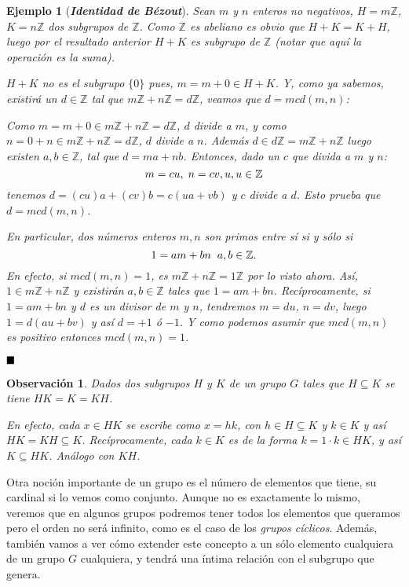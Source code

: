 \documentclass[12pt]{article}
\newtheorem{example}{Ejemplo}[theorem]
\newtheorem{observation}{Observación}[theorem]
\begin{document}
\begin{example}[\textbf{\textit{Identidad de Bézout}}]\label{ex:idBez} Sean $m$ y $n$ enteros no negativos, $H = m\mathbb{Z}$, $K = n\mathbb{Z}$ dos subgrupos de $\mathbb{Z}$. Como $\mathbb{Z}$ es abeliano es obvio que $H+K = K+H$, luego por el resultado anterior $H+K$ es subgrupo de $\mathbb{Z}$ (notar que aquí la operación es la suma).


$H+K$ no es el subgrupo $\lbrace 0 \rbrace$ pues, $m = m + 0 \in H + K$. Y, como ya sabemos, existirá un $d \in \mathbb{Z}$ tal que $m\mathbb{Z}+n\mathbb{Z} = d\mathbb{Z}$, veamos que $d = mcd(m,n)$:


Como $m = m + 0 \in m\mathbb{Z}+n\mathbb{Z} = d\mathbb{Z}$, $d$ divide a $m$, y como $n = 0 + n \in m\mathbb{Z}+n\mathbb{Z} = d\mathbb{Z}$, $d$ divide a $n$. Además $d \in d\mathbb{Z} = m\mathbb{Z} + n\mathbb{Z}$ luego existen $a,b \in \mathbb{Z}$, tal que $d = ma + nb$. Entonces, dado un $c$ que divida a $m$ y $n$:
$$m = cu,\hspace{0.1cm} n = cv, u, u \in \mathbb{Z}$$ tenemos $d = (cu)a + (cv)b = c(ua + vb)$ y $c$ divide a $d$. Esto prueba que $d = mcd(m,n)$. 

En particular, dos números enteros $m,n$ son primos entre sí si y sólo si $$1 = am + bn \hspace{0.2cm} a,b \in \mathbb{Z}.$$ En efecto, si $mcd(m,n) = 1$, es $m\mathbb{Z} + n\mathbb{Z} = 1\mathbb{Z}$ por lo visto ahora. Así, $1 \in m\mathbb{Z}+n\mathbb{Z}$ y existirán $a,b \in \mathbb{Z}$ tales que $1 = am + bn$. Recíprocamente, si $1 = am + bn$ y $d$ es un divisor de $m$ y $n$, tendremos $m = du$, $n = dv$, luego $1 = d(au + bv)$ y así $d = +1$ ó $-1$. Y como podemos asumir que $mcd(m,n)$ es positivo entonces $mcd(m,n) = 1$.
\end{example}

$\hfill \blacksquare$

\begin{observation}\label{ob:gruHinK} Dados dos subgrupos $H$ y $K$ de un grupo $G$ tales que $H \subseteq K$ se tiene $HK = K = KH$.

En efecto, cada $x \in HK$ se escribe como $x=hk$, con $h \in H \subseteq K$ y $k \in K$ y así $HK = KH \subseteq K$. Recíprocamente, cada $k \in K$ es de la forma $k  = 1 \cdot k \in HK$, y así $K \subseteq HK$. Análogo con $KH$.
\end{observation}

Otra noción importante de un grupo es el número de elementos que tiene, su cardinal si lo vemos como conjunto.  Aunque no es exactamente lo mismo, veremos que en algunos grupos podremos tener todos los elementos que queramos pero el orden no será infinito, como es el caso de los \textit{grupos cíclicos}. Además, también vamos a ver cómo extender este concepto a un sólo elemento cualquiera de un grupo $G$ cualquiera, y tendrá una íntima relación con el subgrupo que genera.
\end{document}
